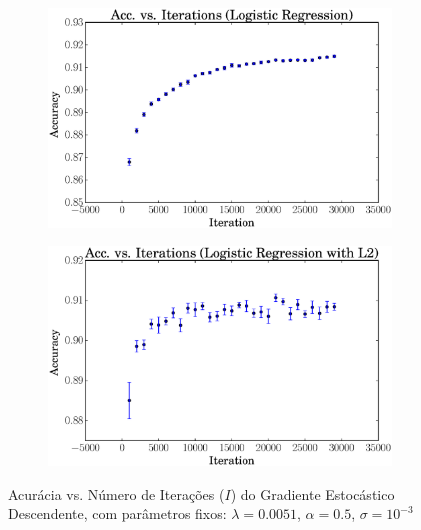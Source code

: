 \documentclass[a4paper, 12pt]{article}
\begin{document}
\begin{figure}[htpb]
\begin{subfigure}[htpb]{0.45\textwidth}
        \caption{}
        \label{fig:it_linregL2}
    \end{subfigure}
    \hfill %
    \begin{subfigure}[htpb]{0.45\textwidth}
        \includegraphics[width=\textwidth]{acc_vs_iterations_logreg}
        \caption{}
        \label{fig:it_logreg}
    \end{subfigure}
    \begin{subfigure}[htpb]{0.45\textwidth}
        \includegraphics[width=\textwidth]{acc_vs_iterations_logregL2}
        \caption{}
        \label{fig:it_logregL2}
    \end{subfigure}
    \caption{Acurácia vs. Número de Iterações ($I$) do Gradiente Estocástico
    Descendente, com parâmetros fixos: $\lambda=0.0051$, $\alpha=0.5$,
    $\sigma=10^{-3}$}\label{fig:it}
\end{figure}
\end{document}
